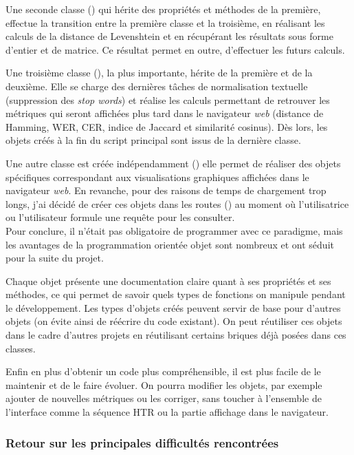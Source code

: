 Une seconde classe () qui hérite des propriétés et méthodes de la première, effectue la transition entre la première classe et la troisième, en réalisant les calculs de la distance de Levenshtein et en récupérant les résultats sous forme d'entier et de matrice. Ce résultat permet en outre, d'effectuer les futurs calculs.

Une troisième classe (), la plus importante, hérite de la première et de la deuxième. Elle se charge des dernières tâches de normalisation textuelle (suppression des \textit{stop words}) et réalise les calculs permettant de retrouver les métriques qui seront affichées plus tard dans le navigateur \textit{web} (distance de Hamming, WER, CER, indice de Jaccard et similarité cosinus). Dès lors, les objets créés à la fin du script principal  sont issus de la dernière classe. 

Une autre classe est créée indépendamment () elle permet de réaliser des objets spécifiques correspondant aux visualisations graphiques affichées dans le navigateur \textit{web}. En revanche, pour des raisons de temps de chargement trop longs, j'ai décidé de créer ces objets dans les routes () au moment où l'utilisatrice ou l'utilisateur formule une requête pour les consulter.\\

Pour conclure, il n'était pas obligatoire de programmer avec ce paradigme, mais les avantages de la programmation orientée objet sont nombreux et ont séduit pour la suite du projet. 

Chaque objet présente une documentation claire quant à ses propriétés et ses méthodes, ce qui permet de savoir quels types de fonctions on manipule pendant le développement. Les types d'objets créés peuvent servir de base pour d'autres objets (on évite ainsi de réécrire du code existant). On peut réutiliser ces objets dans le cadre d'autres projets en réutilisant certains briques déjà posées dans ces classes. 

Enfin en plus d'obtenir un code plus compréhensible, il est plus facile de le maintenir et de le faire évoluer. On pourra modifier les objets, par exemple ajouter de nouvelles métriques ou les corriger, sans toucher à l'ensemble de l'interface comme la séquence HTR ou la partie affichage dans le navigateur.

\subsubsection{Retour sur les principales difficultés rencontrées}

